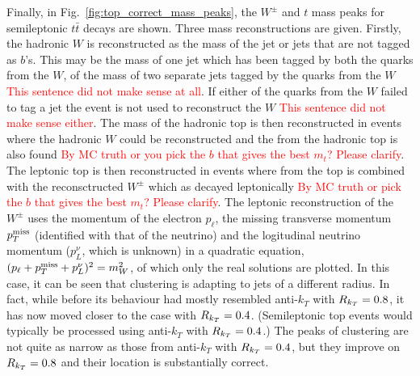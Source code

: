 Finally, in Fig.~\ref{fig:top_correct_mass_peaks}, the $W^\pm$ and $t$ mass peaks for semileptonic $t\bar t$ decays are shown.
Three mass reconstructions are given. Firstly, the hadronic \(W\) is reconstructed as  the mass of the jet or jets that are not tagged as $b$'s.
This may be the mass of one jet which has been tagged by both the quarks from the \(W\),
of the mass of two separate jets tagged by the quarks from the \(W\) {\textcolor{red}{This sentence did not make sense at all}}.
If either of the quarks from the \(W\) failed to tag a jet the event is not used to reconstruct the \(W\) {\textcolor{red}{This sentence did not make sense either}}.
The mass of the hadronic top is then reconstructed in events where the hadronic \(W\) could be reconstructed and the 
from the hadronic top is also found {\textcolor{red}{By MC truth or you pick the $b$ that gives the best $m_t$? Please clarify}}.
The leptonic top is then reconstructed in events where  from the top is combined with the reconsctructed $W^\pm$ which as decayed leptonically
{\textcolor{red}{By MC truth or pick the $b$ that gives the best $m_t$? Please clarify}}.
The leptonic reconstruction of the $W^\pm$ uses the momentum of the electron $p_\ell$, the missing transverse momentum $p_T^{\rm miss}$ (identified with that of the neutrino)
and the logitudinal neutrino momentum ($p_L^\nu$, which is unknown) in a quadratic equation, $(p_\ell+p_T^{\rm miss}+p_L^\nu)^2=m_W^2$, of which only the real solutions are plotted.  In this case, it can be seen that \spectral{} clustering is adapting to jets of a different radius. In fact, 
while before its behaviour had mostly resembled anti-$k_T$ with \(R_{k_T}{} = 0.8\), 
it has now moved closer to the case with \(R_{k_T}{} = 0.4\).
(Semileptonic top events would typically be processed using anti-$k_T$ with \(R_{k_T}{} = 0.4\).)
The peaks of \spectral{} clustering are not quite as narrow as those from anti-$k_T$ with \(R_{k_T}{} = 0.4\),
but they improve on \(R_{k_T}{} = 0.8\) and their  location is substantially correct.

